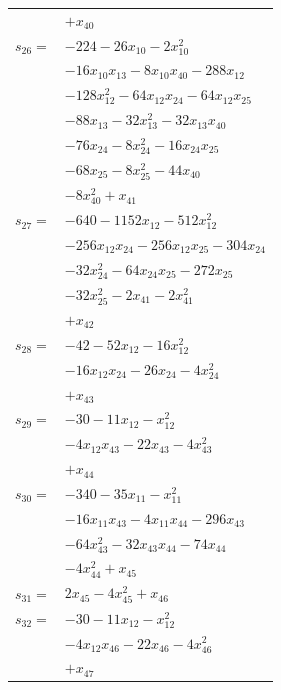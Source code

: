 \begin{longtable}{@{}r@{\;}l@{}}
 & \(\displaystyle +x_{40}\) \\[3pt]
\(s_{26}=\) & \(\displaystyle -224 -26x_{10} -2x_{10}^{2}\) \\
 & \(\displaystyle -16x_{10}x_{13} -8x_{10}x_{40} -288x_{12}\) \\
 & \(\displaystyle -128x_{12}^{2} -64x_{12}x_{24} -64x_{12}x_{25}\) \\
 & \(\displaystyle -88x_{13} -32x_{13}^{2} -32x_{13}x_{40}\) \\
 & \(\displaystyle -76x_{24} -8x_{24}^{2} -16x_{24}x_{25}\) \\
 & \(\displaystyle -68x_{25} -8x_{25}^{2} -44x_{40}\) \\
 & \(\displaystyle -8x_{40}^{2} +x_{41}\) \\[3pt]
\(s_{27}=\) & \(\displaystyle -640 -1152x_{12} -512x_{12}^{2}\) \\
 & \(\displaystyle -256x_{12}x_{24} -256x_{12}x_{25} -304x_{24}\) \\
 & \(\displaystyle -32x_{24}^{2} -64x_{24}x_{25} -272x_{25}\) \\
 & \(\displaystyle -32x_{25}^{2} -2x_{41} -2x_{41}^{2}\) \\
 & \(\displaystyle +x_{42}\) \\[3pt]
\(s_{28}=\) & \(\displaystyle -42 -52x_{12} -16x_{12}^{2}\) \\
 & \(\displaystyle -16x_{12}x_{24} -26x_{24} -4x_{24}^{2}\) \\
 & \(\displaystyle +x_{43}\) \\[3pt]
\(s_{29}=\) & \(\displaystyle -30 -11x_{12} -x_{12}^{2}\) \\
 & \(\displaystyle -4x_{12}x_{43} -22x_{43} -4x_{43}^{2}\) \\
 & \(\displaystyle +x_{44}\) \\[3pt]
\(s_{30}=\) & \(\displaystyle -340 -35x_{11} -x_{11}^{2}\) \\
 & \(\displaystyle -16x_{11}x_{43} -4x_{11}x_{44} -296x_{43}\) \\
 & \(\displaystyle -64x_{43}^{2} -32x_{43}x_{44} -74x_{44}\) \\
 & \(\displaystyle -4x_{44}^{2} +x_{45}\) \\[3pt]
\(s_{31}=\) & \(\displaystyle 2x_{45} -4x_{45}^{2} +x_{46}\) \\[3pt]
\(s_{32}=\) & \(\displaystyle -30 -11x_{12} -x_{12}^{2}\) \\
 & \(\displaystyle -4x_{12}x_{46} -22x_{46} -4x_{46}^{2}\) \\
 & \(\displaystyle +x_{47}\) \\[3pt]

\end{longtable}
